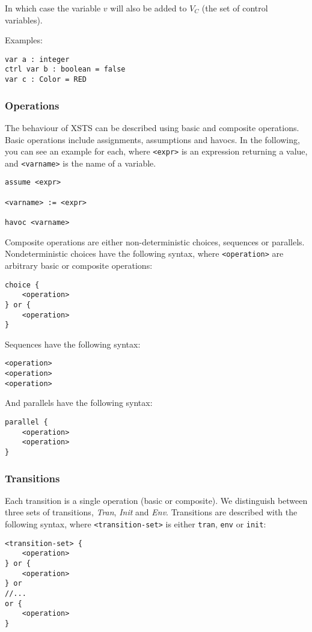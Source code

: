 In which case the variable \(v\) will also be added to \(V_C\) (the set of control variables).

Examples:

\begin{lstlisting}[language=xsts]
var a : integer
ctrl var b : boolean = false
var c : Color = RED
\end{lstlisting}

\subsubsection*{Operations}

The behaviour of XSTS can be described using basic and composite operations. Basic operations include assignments, assumptions and havocs. In the following, you can see an example for each, where \verb*|<expr>| is an expression returning a value, and \verb*|<varname>| is the name of a variable.

\begin{lstlisting}[language=xsts]
assume <expr>

<varname> := <expr>

havoc <varname>
\end{lstlisting}

Composite operations are either non-deterministic choices, sequences or parallels. Nondeterministic choices have the following syntax, where \verb|<operation>| are arbitrary basic or composite operations:


\begin{lstlisting}[language=xsts]
choice { 
	<operation>
} or { 
	<operation>
}
\end{lstlisting}

Sequences have the following syntax:

\begin{lstlisting}[language=xsts]
<operation>
<operation>
<operation>
\end{lstlisting}

And parallels have the following syntax:

\begin{lstlisting}[language=xsts]
parallel { 
	<operation>
	<operation>
}
\end{lstlisting}

\subsubsection*{Transitions}

Each transition is a single operation (basic or composite). We distinguish between three
sets of transitions, \emph{Tran}, \emph{Init} and \emph{Env}. Transitions are described with the following syntax, where \verb|<transition-set>| is either \verb|tran|, \verb|env| or \verb|init|:

\begin{lstlisting}[language=xsts]
<transition-set> {
	<operation>
} or {
	<operation>
} or
//...
or {
	<operation>
}
\end{lstlisting}